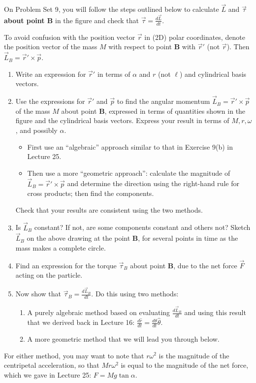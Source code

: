\documentclass[11pt, letterpaper, openany]{book}
\newenvironment{exercise}[1][Exercise]{%
  \tcolorbox[blanker, breakable, left=1em,
    before skip=1em, after skip=1em,
    borderline west={3pt}{0pt}{PhysNavy},
    colback=PhysCream,
    before upper={\textcolor{PhysNavy}{\sffamily\bfseries #1:}\space}
  ]%
}{%
  \endtcolorbox%
}
\begin{document}
\begin{exercise}[Exercise 10]
On Problem Set 9, you will follow the steps outlined below to calculate $\vec{L}$ and $\vec{\tau}$ \textbf{about point B} in the figure and check that $\vec{\tau} = \frac{d\vec{L}}{dt}$.

To avoid confusion with the position vector $\vec{r}$ in (2D) polar coordinates, denote the position vector of the mass $M$ with respect to point \textbf{B} with $\vec{r}'$ (not $\vec{r}$). Then $\vec{L}_B = \vec{r}' \times \vec{p}$.
\begin{enumerate}[label=(\alph*)]
    \item Write an expression for $\vec{r}'$ in terms of $\alpha$ and $r$ (not $\ell$) and cylindrical basis vectors.
    \item Use the expressions for $\vec{r}'$ and $\vec{p}$ to find the angular momentum $\vec{L}_B = \vec{r}' \times \vec{p}$ of the mass $M$ about point \textbf{B}, expressed in terms of quantities shown in the figure and the cylindrical basis vectors. Express your result in terms of $M, r, \omega$, and possibly $\alpha$.
    \begin{itemize}
        \item First use an ``algebraic'' approach similar to that in Exercise 9(b) in Lecture 25.
        \item Then use a more ``geometric approach'': calculate the magnitude of $\vec{L}_B = \vec{r}' \times \vec{p}$ and determine the direction using the right-hand rule for cross products; then find the components.
    \end{itemize}
    Check that your results are consistent using the two methods.
    \item Is $\vec{L}_B$ constant? If not, are some components constant and others not? Sketch $\vec{L}_B$ on the above drawing at the point \textbf{B}, for several points in time as the mass makes a complete circle.
    \item Find an expression for the torque $\vec{\tau}_B$ about point \textbf{B}, due to the net force $\vec{F}$ acting on the particle.
    \item Now show that $\vec{\tau}_B = \frac{d\vec{L}_B}{dt}$. Do this using two methods:
    \begin{enumerate}[label=(\roman*)]
        \item A purely algebraic method based on evaluating $\frac{d\vec{L}_B}{dt}$ and using this result that we derived back in Lecture 16: $\frac{d\hat{r}}{dt} = \frac{d\theta}{dt}\hat{\theta}$.
        \item A more geometric method that we will lead you through below.
    \end{enumerate}
\end{enumerate}
For either method, you may want to note that $r\omega^2$ is the magnitude of the centripetal acceleration, so that $Mr\omega^2$ is equal to the magnitude of the net force, which we gave in Lecture 25: $F = Mg\tan\alpha$.


\end{exercise}
\end{document}
